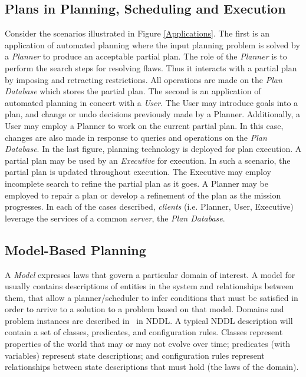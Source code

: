 \documentclass[10pt, letterpaper, twoside]{article}
\begin{document}
\subsection{Plans in Planning, Scheduling and Execution}
\label{plan-sched-exec}
Consider the scenarios illustrated in Figure \ref{Applications}. The first
is an application of automated planning where the input planning problem is
solved by a {\em Planner} to produce an acceptable partial plan. The role
of the {\em Planner} is to perform the search steps for resolving
flaws. Thus it interacts with a partial plan by imposing and retracting
restrictions. All operations are made on the {\em Plan Database} which
stores the partial plan.  The second is an application of automated
planning in concert with a {\em User}. The User may introduce goals into a
plan, and change or undo decisions previously made by a
Planner. Additionally, a User may employ a Planner to work on the current
partial plan.  In this case, changes are also made in response to queries
and operations on the {\em Plan Database}.  In the last figure, planning
technology is deployed for plan execution. A partial plan may be used by an
{\em Executive} for execution. In such a scenario, the partial plan is
updated throughout execution. The Executive may employ incomplete search to
refine the partial plan as it goes. A Planner may be employed to repair a
plan or develop a refinement of the plan as the mission progresses. In each
of the cases described, {\em clients} (i.e. Planner, User, Executive)
leverage the services of a common {\em server}, the {\em Plan Database}.
\begin{figure*}[t]
\centering{}
\caption{Sample Plan Database Applications}
\label{Applications}
\end{figure*}

\subsection{Model-Based Planning}
\label{mb-plan}
A {\em Model} expresses laws that govern a particular domain of interest.
A model for \ET\, usually contains descriptions of entities in the system
and relationships between them, that allow a planner/scheduler to infer
conditions that must be satisfied in order to arrive to a solution to a
problem based on that model.  Domains and problem instances are
described in \ET\, in NDDL.  A typical NDDL description will contain a set
of classes, predicates, and configuration rules.  Classes represent
properties of the world that may or may not evolve over time; predicates
(with variables) represent state descriptions; and configuration rules
represent relationships between state descriptions that must hold (the laws
of the domain). 
\end{document}
